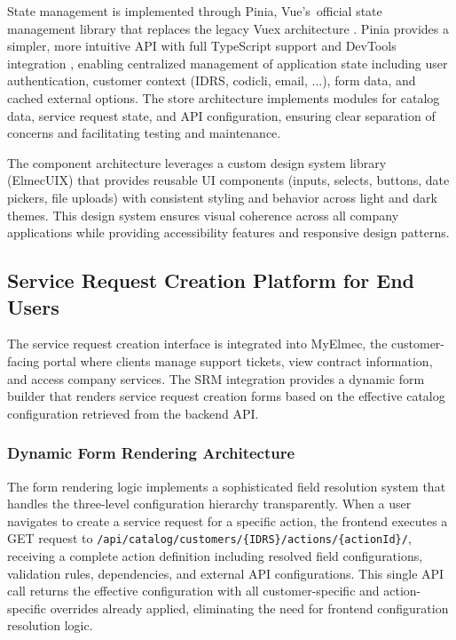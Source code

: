 State management is implemented through Pinia, Vue's~official state management library that replaces the legacy Vuex architecture \cite{pinia}. Pinia provides a simpler, more intuitive API with full TypeScript support and DevTools integration \cite{pinia}, enabling centralized management of application state including user authentication, customer context (IDRS, codicli, email, ...), form data, and cached external options. The store architecture implements modules for catalog data, service request state, and API configuration, ensuring clear separation of concerns and facilitating testing and maintenance.

The component architecture leverages a custom design system library (ElmecUIX) that provides reusable UI components (inputs, selects, buttons, date pickers, file uploads) with consistent styling and behavior across light and dark themes. This design system ensures visual coherence across all company applications while providing accessibility features and responsive design patterns.

\subsection{Service Request Creation Platform for End Users}

The service request creation interface is integrated into MyElmec, the customer-facing portal where clients manage support tickets, view contract information, and access company services. The SRM integration provides a dynamic form builder that renders service request creation forms based on the effective catalog configuration retrieved from the backend API.

\subsubsection{Dynamic Form Rendering Architecture}

The form rendering logic implements a sophisticated field resolution system that handles the three-level configuration hierarchy transparently. When a user navigates to create a service request for a specific action, the frontend executes a GET request to \texttt{/api/catalog/customers/\{IDRS\}/actions/\{actionId\}/}, receiving a complete action definition including resolved field configurations, validation rules, dependencies, and external API configurations. This single API call returns the effective configuration with all customer-specific and action-specific overrides already applied, eliminating the need for frontend configuration resolution logic.

